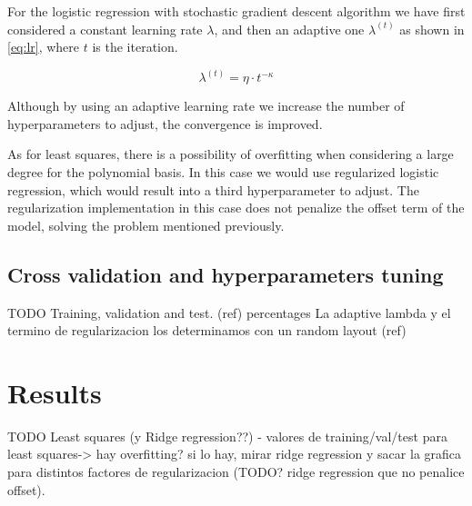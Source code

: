 \documentclass[10pt,conference,compsocconf]{IEEEtran}
\begin{document}
  For the logistic regression with stochastic gradient descent algorithm we have first considered a constant learning rate $\lambda$, and then an adaptive one $\lambda^{(t)}$ as shown in \ref{eq:lr}, where $t$ is the iteration.

  \begin{equation}
    \label{eq:lr}
      \lambda^{(t)} = \eta \cdot t ^{- \kappa}
  \end{equation}

  Although by using an adaptive learning rate we increase the number of hyperparameters to adjust, the convergence is improved.

  As for least squares, there is a possibility of overfitting when considering a large degree for the polynomial basis. In this case we would use regularized logistic regression, which would result into a third hyperparameter to adjust. The regularization implementation in this case does not penalize the offset term of the model, solving the problem mentioned previously.

\subsection{Cross validation and hyperparameters tuning} %
\label{sub:cross_validation_and_hyperparameters_tuning}
TODO Training, validation and test. (ref)
percentages
La adaptive lambda y el termino de regularizacion los determinamos con un random layout (ref)





\section{Results}
\label{sec:results}
TODO
Least squares (y Ridge regression??)
- valores de training/val/test para least squares-> hay overfitting?
si lo hay, mirar ridge regression y sacar la grafica para distintos factores de regularizacion (TODO? ridge regression que no penalice offset).
\end{document}
